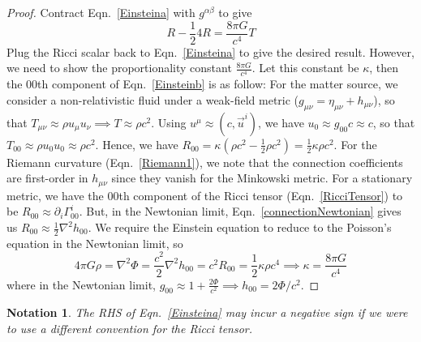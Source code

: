 \documentclass[a4paper]{article}
\newtheorem{notation}{Notation}[section]
\theoremstyle{new}
\begin{document}
\begin{proof}
Contract Eqn.~\ref{Einsteina} with $g^{\alpha\beta}$ to give
$$R-\frac{1}{2}4R=\frac{8\pi G}{c^4}T$$
Plug the Ricci scalar back to Eqn.~\ref{Einsteina} to give the desired result. However, we need to show the proportionality constant $\frac{8\pi G}{c^4}$. Let this constant be $\kappa$, then the 00th component of Eqn.~\ref{Einsteinb} is as follow: For the matter source, we consider a non-relativistic fluid under a weak-field metric ($g_{\mu\nu}=\eta_{\mu\nu}+h_{\mu\nu}$), so that $T_{\mu\nu}\approx\rho u_\mu u_\nu\implies T\approx\rho c^2$. Using $u^\mu\approx(c,\vec{u}^i)$, we have $u_0\approx g_{00}c\approx c$, so that $T_{00}\approx\rho u_0u_0\approx \rho c^2$. Hence, we have $R_{00}=\kappa(\rho c^2-\frac{1}{2}\rho c^2)=\frac{1}{2}\kappa\rho c^2$. For the Riemann curvature (Eqn.~\ref{Riemann1}), we note that the connection coefficients are first-order in $h_{\mu\nu}$ since they vanish for the Minkowski metric. For a stationary metric, we have the 00th component of the Ricci tensor (Eqn.~\ref{RicciTensor}) to be $R_{00}\approx\partial_i\Gamma^i_{00}$. But, in the Newtonian limit, Eqn.~\ref{connectionNewtonian} gives us $R_{00}\approx\frac{1}{2}\nabla^2h_{00}$. We require the Einstein equation to reduce to the Poisson's equation in the Newtonian limit, so
$$4\pi G\rho=\nabla^2\Phi=\frac{c^2}{2}\nabla^2h_{00}=c^2R_{00}=\frac{1}{2}\kappa\rho c^4\implies\kappa=\frac{8\pi G}{c^4}$$
where in the Newtonian limit, $g_{00}\approx1+\frac{2\Phi}{c^2}\implies h_{00}=2\Phi/c^2$.
\end{proof}
\begin{notation}
The RHS of Eqn.~\ref{Einsteina} may incur a negative sign if we were to use a different convention for the Ricci tensor.
\end{notation}
\end{document}
